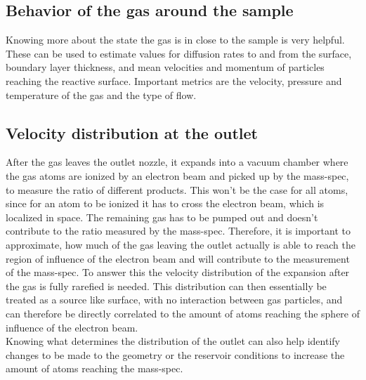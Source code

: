 \subsection{Behavior of the gas around the sample}
	Knowing more about the state the gas is in close to the sample is very helpful.
	These can be used to estimate values for diffusion rates to and from the surface, boundary layer thickness, and mean velocities and momentum of particles reaching the reactive surface. 
	Important metrics are the velocity, pressure and temperature of the gas and the type of flow.

\subsection{Velocity distribution at the outlet}
	After the gas leaves the outlet nozzle, it expands into a vacuum chamber where the gas atoms are ionized by an electron beam and picked up by the mass-spec, to measure the ratio of different products.
	This won't be the case for all atoms, since for an atom to be ionized it has to cross the electron beam, which is localized in space.
	The remaining gas has to be pumped out and doesn't contribute to the ratio measured by the mass-spec.
	Therefore, it is important to approximate, how much of the gas leaving the outlet actually is able to reach the region of influence of the electron beam and will contribute to the measurement of the mass-spec.
	To answer this the velocity distribution of the expansion after the gas is fully rarefied is needed.
	This distribution can then essentially be treated as a source like surface, with no interaction between gas particles, and can therefore be directly correlated to the amount of atoms reaching the sphere of influence of the electron beam.\\
	Knowing what determines the distribution of the outlet can also help identify changes to be made to the geometry or the reservoir conditions to increase the amount of atoms reaching the mass-spec.
